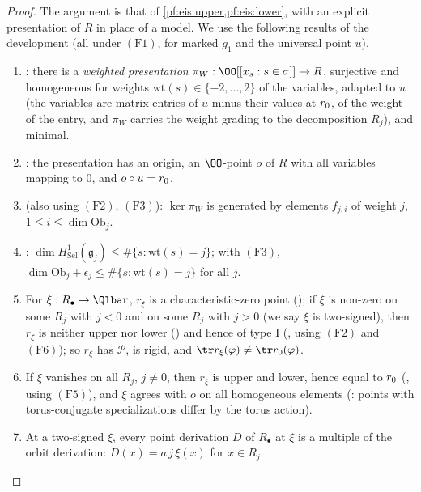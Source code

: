 \begin{proof}
The argument is that of \cref{pf:eis:upper,pf:eis:lower}, with an explicit presentation of $R$ in place of a model. We use the
following results of the development (all under $(\mathrm{F1})$, for marked $g_1$ and the universal point $u$).
\begin{enumerate}[label=(\arabic*)]
\item {}: there is a \emph{weighted presentation}
  $\pi_W:\OO[[x_s:s\in\sigma]]\to R$, surjective and homogeneous for weights $\mathrm{wt}(s)\in\{-2,\dots,2\}$ of the variables, adapted to $u$
  (the variables are matrix entries of $u$ minus their values at $r_0$, of the weight of the entry, and $\pi_W$ carries the weight
  grading to the decomposition $R_j$), and minimal.
\item {}: the presentation has an origin, an $\OO$-point $o$ of $R$ with all variables
  mapping to $0$, and $o\circ u=r_0$.
\item {} (also using $(\mathrm{F2})$, $(\mathrm{F3})$): $\ker\pi_W$ is generated by
  elements $f_{j,i}$ of weight $j$, $1\le i\le\dim\mathrm{Ob}_j$.
\item {}: $\dim H^1_{\mathrm{Sel}}(\bar{\mathfrak g}_j)\le\#\{s:\mathrm{wt}(s)=j\}$; with
  $(\mathrm{F3})$, $\dim\mathrm{Ob}_j+\epsilon_j\le\#\{s:\mathrm{wt}(s)=j\}$ for all $j$.
\item For $\xi:R_\bullet\to\Qlbar$, $r_\xi$ is a characteristic-zero point
  (); if $\xi$ is non-zero on some $R_j$ with $j<0$ and on some $R_j$
  with $j>0$ (we say $\xi$ is two-signed), then $r_\xi$ is neither upper nor lower
  () and hence of type I
  (, using $(\mathrm{F2})$ and $(\mathrm{F6})$); so $r_\xi$ has $\mathcal P$, is rigid,
  and $\tr r_\xi(\varphi)\ne\tr\eisrz(\varphi)$.
\item If $\xi$ vanishes on all $R_j$, $j\ne0$, then $r_\xi$ is upper and lower, hence equal to $r_0$
  (, using $(\mathrm{F5})$), and $\xi$ agrees with $o$ on all homogeneous elements
  (: points with torus-conjugate specializations differ by the torus action).
\item At a two-signed $\xi$, every point derivation $D$ of $R_\bullet$ at $\xi$ is a multiple of the orbit derivation: $D(x)=a\,j\,\xi(x)$ for $x\in R_j$

\end{enumerate}
\end{proof}
